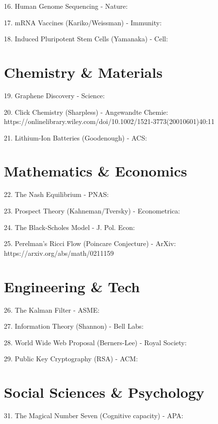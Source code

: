\documentclass[12pt]{article}
\begin{document}
16. Human Genome Sequencing - Nature:
\cite{Hopfner2002therad50zi}

17. mRNA Vaccines (Kariko/Weissman) - Immunity:
\cite{Karikó2005suppressio}

18. Induced Pluripotent Stem Cells (Yamanaka) - Cell:
\cite{Takahashi2006inductiono}

\section{Chemistry & Materials}
19. Graphene Discovery - Science:
\cite{Novoselov2004electricfi}

20. Click Chemistry (Sharpless) - Angewandte Chemie:
https://onlinelibrary.wiley.com/doi/10.1002/1521-3773(20010601)40:11%

21. Lithium-Ion Batteries (Goodenough) - ACS:
\cite{Chamberlain1983arylisomer}

\section{Mathematics & Economics}
22. The Nash Equilibrium - PNAS:
\cite{Nash1950equilibriu}

23. Prospect Theory (Kahneman/Tversky) - Econometrica:
\cite{Kahneman1979prospectth}

24. The Black-Scholes Model - J. Pol. Econ:
\cite{Black1973thepricing}

25. Perelman's Ricci Flow (Poincare Conjecture) - ArXiv:
https://arxiv.org/abs/math/0211159

\section{Engineering & Tech}
26. The Kalman Filter - ASME:
\cite{Kalman1960anewapproa}

27. Information Theory (Shannon) - Bell Labs:
\cite{Shannon1948amathemati}

28. World Wide Web Proposal (Berners-Lee) - Royal Society:
\cite{Hernández2009amultiform}

29. Public Key Cryptography (RSA) - ACM:
\cite{Rivest1978amethodfor}

\section{Social Sciences & Psychology}
31. The Magical Number Seven (Cognitive capacity) - APA:
\cite{Miller1956themagical}
\end{document}
